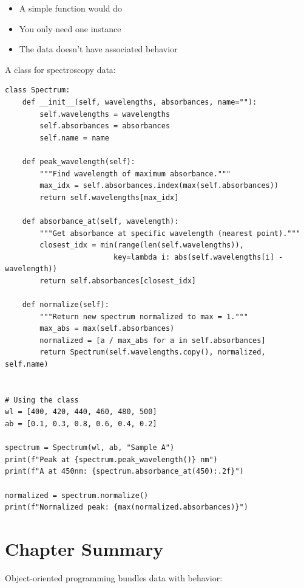 \begin{itemize}
    \item A simple function would do
    \item You only need one instance
    \item The data doesn't have associated behavior
\end{itemize}

\begin{labexample}
A class for spectroscopy data:

\begin{lstlisting}
class Spectrum:
    def __init__(self, wavelengths, absorbances, name=""):
        self.wavelengths = wavelengths
        self.absorbances = absorbances
        self.name = name

    def peak_wavelength(self):
        """Find wavelength of maximum absorbance."""
        max_idx = self.absorbances.index(max(self.absorbances))
        return self.wavelengths[max_idx]

    def absorbance_at(self, wavelength):
        """Get absorbance at specific wavelength (nearest point)."""
        closest_idx = min(range(len(self.wavelengths)),
                         key=lambda i: abs(self.wavelengths[i] - wavelength))
        return self.absorbances[closest_idx]

    def normalize(self):
        """Return new spectrum normalized to max = 1."""
        max_abs = max(self.absorbances)
        normalized = [a / max_abs for a in self.absorbances]
        return Spectrum(self.wavelengths.copy(), normalized, self.name)


# Using the class
wl = [400, 420, 440, 460, 480, 500]
ab = [0.1, 0.3, 0.8, 0.6, 0.4, 0.2]

spectrum = Spectrum(wl, ab, "Sample A")
print(f"Peak at {spectrum.peak_wavelength()} nm")
print(f"A at 450nm: {spectrum.absorbance_at(450):.2f}")

normalized = spectrum.normalize()
print(f"Normalized peak: {max(normalized.absorbances)}")
\end{lstlisting}
\end{labexample}

\section{Chapter Summary}
\label{sec:oop-summary}

Object-oriented programming bundles data with behavior:

